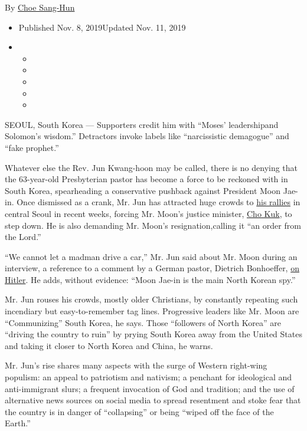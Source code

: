 By \href{https://www.nytimes3xbfgragh.onion/by/choe-sang-hun}{Choe
Sang-Hun}

\begin{itemize}
\item
  Published Nov. 8, 2019Updated Nov. 11, 2019
\item
  \begin{itemize}
  \item
  \item
  \item
  \item
  \item
  \end{itemize}
\end{itemize}

SEOUL, South Korea​ --- Supporters credit him with ``Moses' leadership​
and Solomon's wisdom​.'' Detractors invoke labels like ``narcissistic
demagogue'' and ``fake prophet.''

Whatever else the Rev. Jun Kwang-hoon may be called, there is no denying
that the 63-year-old Presbyterian pastor has become a force to be
reckoned with in South Korea, spearheading a conservative pushback
against President Moon Jae-in. Once dismissed as a crank, Mr. Jun has
attracted huge crowds to
\href{https://www.nytimes3xbfgragh.onion/2019/10/12/world/asia/south-korea-protests.html?searchResultPosition=4}{his
rallies} in central Seoul in recent weeks, forcing Mr. Moon's justice
minister,
\href{https://www.nytimes3xbfgragh.onion/2019/10/14/world/asia/south-korea-cho-kuk-resigns.html?searchResultPosition=3}{Cho
Kuk}​, to step down. He is also demanding Mr. Moon's resignation,
​calling it ``an order from the Lord.''

``We cannot let a madman drive a car,'' Mr. Jun said about Mr. Moon
during an interview, a reference to a comment by a German pastor,
Dietrich Bonhoeffer, \href{https://www.azquotes.com/quote/917469}{on
Hitler}. He adds, without evidence: ``Moon Jae-in is the main North
Korean spy.''

Mr. Jun rouses his crowds, mostly older Christians, by constantly
repeating such incendiary but easy-to-remember tag lines. Progressive
leaders like Mr. Moon are ``Communizing'' South Korea, he says. Those
``followers of North Korea'' are ``driving the country to ruin'' by
prying South Korea away from the United States and taking it closer to
North Korea and China​, he warns​.

Mr. Jun's rise shares many aspects with the surge of Western right-wing
populism: an appeal to patriotism and nativism; a penchant for
ideological and anti-immigrant slurs; a frequent invocation of God and
tradition; and the use of alternative news sources on social media to
spread resentment and stoke fear that the country is in danger of
``collapsing'' or being ``wiped off the face of the Earth.''

